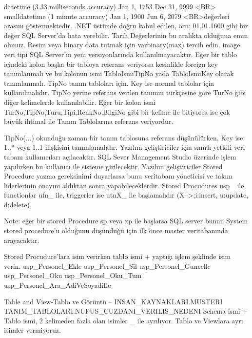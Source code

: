 \documentclass[10pt,a4paper,draft]{article}
\begin{document}
  
  				datetime (3.33 milliseconds accuracy)  	Jan 1, 1753  	Dec 31, 9999
  				 <BR>				smalldatetime (1 minute accuracy) 	Jan 1, 1900 	Jun 6, 2079		
  				 <BR>değerleri arasını göstermektedir. .NET üstünde doğru kabul edilen, 
  örn: 01.01.1600 gibi bir değer SQL Server'da				hata verebilir. Tarih 
  Değerlerinin bu aralıkta olduğuna emin olunuz.						 
  			Resim veya binary data tutmak için varbinary(max) tercih edin. image 
  veri tipi SQL Server'ın yeni versiyonlarında			kullanılmayacaktır.		 
  			Eğer bir tablo içindeki kolon başka bir tabloya referans veriyorsa 
  kesinlikle foreign key tanımlanmalı ve bu			kolonun ismi TabloIsmiTipNo yada 
  TabloIsmiKey olarak tanımlanmalı. TipNo tanım tabloları için. Key ise normal 
  tablolar			için kullanılmalıdır.	
    TipNo yerine referans verilen tanımın türkçesine göre TurNo
    gibi diğer kelimelerde kullanılabilir.
    Eğer bir kolon ismi TurNo,TipNo,Turu,Tipi,RenkNo,BilgiNo
    gibi bir kelime ile bitiyorsa ise çok büyük ihtimal ile
    Tanım Tablolarına referans veriyordur.
    

  
  			TipNo(...) okunduğu zaman bir tanım tablosuna referans düşünülürken, Key ise 
  1..* veya 1..1 ilişkisini tanımlamalıdır.		 
  			Yazılım geliştiriciler için sınırlı yetkili veri tabanı kullanıcıları 
  açılacaktır. SQL Sever Management Studio üzerinde işlem			yapılırken bu 
  kullanıcı ile sisteme girilecektir.		 
  			Yazılım geliştiriciler Stored Procedure yazma gereksinimi duyarlarsa 
  bunu veritabanı yöneticisi ve takım liderlerinin onayını			 aldıktan sonra 
  yapabileceklerdir.		 
  			Stored Procudures usp\_ ile, functionlar ufn\_ ile, triggerler ise 
  utnX\_ ile başlamalıdır (X-->;i:insert, u:update, d:delete). 			
  
  
  Note: eğer bir 
  stored Procedure sp veya xp ile başlarsa SQL server 			bunun System stored 
  procedure'u olduğunu düşündüğü için ilk önce master veritabanında arayacaktır. 
  
  
  Stored Procudure'lara isim verirken tablo ismi + yaptığı işlem şeklinde 
  isim verin.
		usp\_Personel\_Ekle			usp\_Personel\_Sil			 
		usp\_Personel\_Guncelle		usp\_Personel\_Oku			 
		usp\_Personel\_Oku\_Tum		usp\_Personel\_Ara\_AdiVeSoyadiIle
  
     Table and View-Tablo ve Görüntü 
     -- 
    INSAN\_KAYNAKLARI.MUSTERI 
      			TANIM\_TABLOLARI.NUFUS\_CUZDANI\_VERILIS\_NEDENI 
    Schema ismi + Tablo ismi, 2 kelimeden fazla olan isimler \_ ile 
      ayrılıyor. Tablo ve Viewlara ayrı isimler vermiyoruz.		  
  
\end{document}

